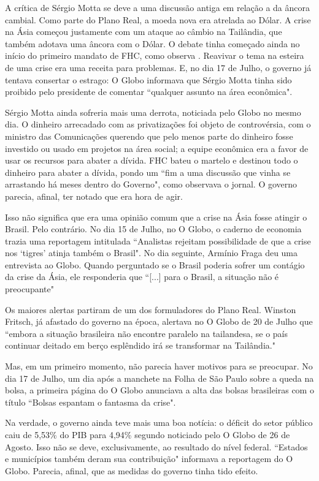 \documentclass{article}
\begin{document}
A crítica de Sérgio Motta se deve a uma discussão antiga em relação a da âncora cambial. Como parte do Plano Real, a moeda nova era atrelada ao Dólar. A crise na Ásia começou justamente com um ataque ao câmbio na Tailândia, que também adotava uma âncora com o Dólar. O debate tinha começado ainda no início do primeiro mandato de FHC, como observa \cite[p. 332]{Werneck2014}. Reavivar o tema na esteira de uma crise era uma receita para problemas. E, no dia 17 de Julho, o governo já tentava consertar o estrago: O Globo informava que Sérgio Motta tinha sido proibido pelo presidente de comentar ``qualquer assunto na área econômica".

Sérgio Motta ainda sofreria mais uma derrota, noticiada pelo Globo no mesmo dia. O dinheiro arrecadado com as privatizações foi objeto de controvérsia, com o ministro das Comunicações querendo que pelo menos parte do dinheiro fosse investido ou usado em projetos na área social; a equipe econômica era a favor de usar os recursos para abater a dívida. FHC bateu o martelo e destinou todo o dinheiro para abater a dívida, pondo um ``fim a uma discussão que vinha se arrastando há meses dentro do Governo", como observava o jornal. O governo parecia, afinal, ter notado que era hora de agir.

Isso não significa que era uma opinião comum que a crise na Ásia fosse atingir o Brasil. Pelo contrário. No dia 15 de Julho, no O Globo, o caderno de economia trazia uma reportagem intitulada ``Analistas rejeitam possibilidade de que a crise nos `tigres' atinja também o Brasil". No dia seguinte, Armínio Fraga deu uma entrevista ao Globo. Quando perguntado se o Brasil poderia sofrer um contágio da crise da Ásia, ele responderia que ``[...] para o Brasil, a situação não é preocupante"  

Os maiores alertas partiram de um dos formuladores do Plano Real. Winston Fritsch, já afastado do governo na época, alertava no O Globo de 20 de Julho que ``embora a situação brasileira não encontre paralelo na tailandesa, se o país continuar deitado em berço esplêndido irá se transformar na Tailândia." 

Mas, em um primeiro momento, não parecia haver motivos para se preocupar. No dia 17 de Julho, um dia após a manchete na Folha de São Paulo sobre a queda na bolsa, a primeira página do O Globo anunciava a alta das bolsas brasileiras com o título ``Bolsas espantam o fantasma da crise".    

Na verdade, o governo ainda teve mais uma boa notícia: o déficit do setor público caiu de 5,53\% do PIB para 4,94\% segundo noticiado pelo O Globo de 26 de Agosto. Isso não se deve, exclusivamente, ao resultado do nível federal. ``Estados e municípios também deram sua contribuição" informava a reportagem do O Globo. Parecia, afinal, que as medidas do governo tinha tido efeito. 
\end{document}
